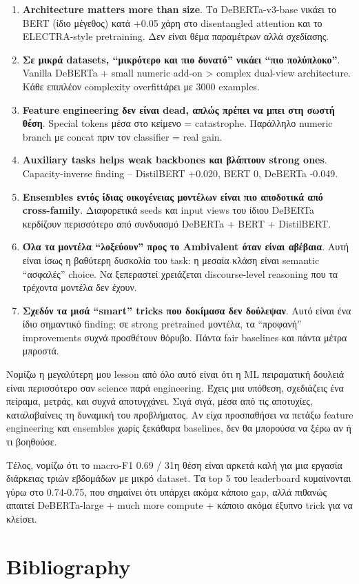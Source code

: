 \documentclass[12pt]{fphw}
\begin{document}
\begin{enumerate}
    \item \textbf{Architecture matters more than size}. Το DeBERTa-v3-base νικάει το BERT (ίδιο μέγεθος) κατά +0.05 χάρη στο disentangled attention και το ELECTRA-style pretraining. Δεν είναι θέμα παραμέτρων αλλά σχεδίασης.

    \item \textbf{Σε μικρά datasets, ``μικρότερο και πιο δυνατό'' νικάει ``πιο πολύπλοκο''}. Vanilla DeBERTa + small numeric add-on > complex dual-view architecture. Κάθε επιπλέον complexity overfittάρει με 3000 examples.

    \item \textbf{Feature engineering δεν είναι dead, απλώς πρέπει να μπει στη σωστή θέση}. Special tokens μέσα στο κείμενο = catastrophe. Παράλληλο numeric branch με concat πριν τον classifier = real gain.

    \item \textbf{Auxiliary tasks helps weak backbones και βλάπτουν strong ones}. Capacity-inverse finding -- DistilBERT +0.020, BERT 0, DeBERTa -0.049.

    \item \textbf{Ensembles εντός ίδιας οικογένειας μοντέλων είναι πιο αποδοτικά από cross-family}. Διαφορετικά seeds και input views του ίδιου DeBERTa κερδίζουν περισσότερο από συνδυασμό DeBERTa + BERT + DistilBERT.

    \item \textbf{Όλα τα μοντέλα ``λοξεύουν'' προς το Ambivalent όταν είναι αβέβαια}. Αυτή είναι ίσως η βαθύτερη δυσκολία του task: η μεσαία κλάση είναι semantic ``ασφαλές'' choice. Να ξεπεραστεί χρειάζεται discourse-level reasoning που τα τρέχοντα μοντέλα δεν έχουν.

    \item \textbf{Σχεδόν τα μισά ``smart'' tricks που δοκίμασα δεν δούλεψαν}. Αυτό είναι ένα ίδιο σημαντικό finding: σε strong pretrained μοντέλα, τα ``προφανή'' improvements συχνά προσθέτουν θόρυβο. Πάντα fair baselines και πάντα μέτρα μπροστά.
\end{enumerate}

Νομίζω η μεγαλύτερη μου lesson από όλο αυτό είναι ότι η ML πειραματική δουλειά είναι περισσότερο σαν science παρά engineering. Έχεις μια υπόθεση, σχεδιάζεις ένα πείραμα, μετράς, και συχνά αποτυγχάνει. Σιγά σιγά, μέσα από τις αποτυχίες, καταλαβαίνεις τη δυναμική του προβλήματος. Αν είχα προσπαθήσει να πετάξω feature engineering και ensembles χωρίς ξεκάθαρα baselines, δεν θα μπορούσα να ξέρω αν ή τι βοηθούσε.

Τέλος, νομίζω ότι το macro-F1 0.69 / 31η θέση είναι αρκετά καλή για μια εργασία διάρκειας τριών εβδομάδων με μικρό dataset. Τα top 5 του leaderboard κυμαίνονται γύρω στο 0.74-0.75, που σημαίνει ότι υπάρχει ακόμα κάποιο gap, αλλά πιθανώς απαιτεί DeBERTa-large + much more compute + κάποιο ακόμα έξυπνο trick για να κλείσει.

\section{Bibliography}



\end{document}
